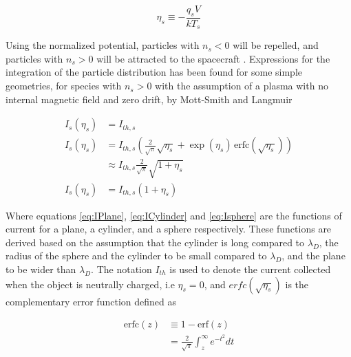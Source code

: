 \begin{equation}\label{eq:normPot}
    \eta_s \equiv - \frac{q_s V}{k T_s}
\end{equation}

Using the normalized potential, particles with $n_s < 0$ will be repelled, and particles with $n_s > 0$ will be attracted to the spacecraft . Expressions for the integration of the particle distribution has been found for some simple geometries, for species with $n_s > 0$ with the assumption of a plasma with no internal magnetic field and zero drift, by Mott-Smith and Langmuir 

\begin{subequations}
    \begin{align}
        I_s (\eta_s) &= I_{th,s} \label{eq:IPlane} \\
        I_s (\eta_s) &= I_{th,s} \left(\frac{2}{\sqrt{\pi}} \sqrt{\eta_s} + \exp(\eta_s) \hspace{2pt} \text{erfc}(\sqrt{\eta_s}) \right) \label{eq:ICylinder}\\
        & \approx I_{th,s} \frac{2}{\sqrt{\pi}} \sqrt{1 + \eta_s} \\
        I_s(\eta_s)  &= I_{th,s} (1 + \eta_s) \label{eq:Isphere}
    \end{align}
\end{subequations}

Where equations \ref{eq:IPlane}, \ref{eq:ICylinder} and \ref{eq:Isphere} are the functions of current for a plane, a cylinder, and a sphere respectively. These functions are derived based on the assumption that the cylinder is long compared to $\lambda_D$, the radius of the sphere and the cylinder to be small compared to $\lambda_D$, and the plane to be wider than $\lambda_D$. The notation $I_{th}$ is used to denote the current collected when the object is neutrally charged, i.e $\eta_s = 0$, and $erfc(\sqrt{\eta_s})$ is the complementary error function defined as

\begin{subequations}
    \begin{align*}
        \text{erfc}(z) &\equiv 1 - \text{erf}(z) \\
        &= \frac{2}{\sqrt{\pi}} \int^\infty_z e^{-t^2} dt
    \end{align*}
\end{subequations}


